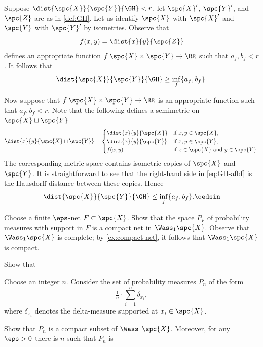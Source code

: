 Suppose $\dist{\spc{X}}{\spc{Y}}{\GH}<r$, let $\spc{X}'$, $\spc{Y}'$, and $\spc{Z}$ are as in \ref{def:GH}.
Let us identify $\spc{X}$ with $\spc{X}'$ and  $\spc{Y}$ with $\spc{Y}'$ by isometries.
Observe that  
\[f(x,y)=\dist{x}{y}{\spc{Z}}\]
defines an appropriate function $f\:\spc{X}\times\spc{Y}\to\RR$ such that 
$a_f,b_f<r$.
It follows that 
\[\dist{\spc{X}}{\spc{Y}}{\GH}\ge\inf_f\{a_f,b_f\}.\]

Now suppose that $f\:\spc{X}\times\spc{Y}\to\RR$ is an appropriate function such that 
$a_f,b_f<r$.
Note that the following defines a semimetric on $\spc{X}\sqcup\spc{Y}$
\[\dist{x}{y}{\spc{X}\sqcup\spc{Y}}=
\begin{cases}
\dist{x}{y}{\spc{X}}&\text{if\ } x,y\in \spc{X},
\\
\dist{x}{y}{\spc{Y}}&\text{if\ } x,y\in \spc{Y},
\\
f(x,y)&\text{if\ } x\in \spc{X}\ \text{and}\ y\in \spc{Y}.
\end{cases}
\]
The corresponding metric space contains isometric copies of $\spc{X}$ and $\spc{Y}$.
It is straightforward to see that the right-hand side in \ref{eq:GH-afbf} is the Hausdorff distance between these copies.
Hence 
\[\dist{\spc{X}}{\spc{Y}}{\GH}\le\inf_f\{a_f,b_f\}.\qedsin\]

















Choose a finite $\eps$-net $F\subset\spc{X}$.
Show that the space $P_F$ of probability measures with support in $F$ is a compact net in $\Wass_1\spc{X}$.
Observe that $\Wass_1\spc{X}$ is complete; 
by \ref{ex:compact-net}, it follows that $\Wass_1\spc{X}$ is compact.

Show that 

Choose an integer $n$.
Consider the set of probability measures $P_n$ of the form 
\[\tfrac1n\cdot\sum_{i=1}^n\delta_{x_i},\]
where $\delta_{x_i}$ denotes the delta-measure supported at $x_i\in\spc{X}$. 

Show that $P_n$ is a compact subset of $\Wass_1\spc{X}$.
Moreover, for any $\eps>0$ there is $n$ such that $P_n$ is 





















